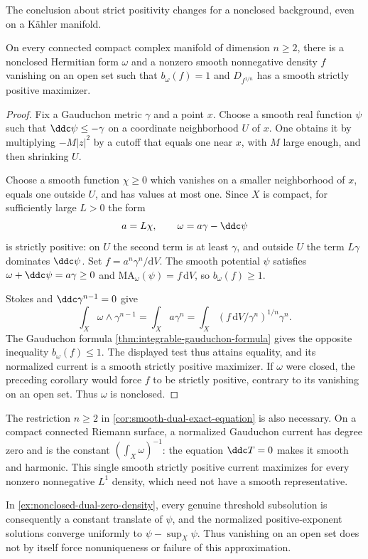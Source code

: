 The conclusion about strict positivity changes for a nonclosed background, even on a K\"ahler manifold.

\begin{example}\label{ex:nonclosed-dual-zero-density}
On every connected compact complex manifold of dimension $n\geq2$, there is a nonclosed Hermitian form $\omega$ and a nonzero smooth nonnegative density $f$ vanishing on an open set such that $b_\omega(f)=1$ and $D_{f^{1/n}}$ has a smooth strictly positive maximizer.
\end{example}
\begin{proof}
Fix a Gauduchon metric $\gamma$ and a point $x$. Choose a smooth real function $\psi$ such that $\ddc\psi\leq-\gamma$ on a coordinate neighborhood $U$ of $x$. One obtains it by multiplying $-M|z|^2$ by a cutoff that equals one near $x$, with $M$ large enough, and then shrinking $U$.

Choose a smooth function $\chi\geq0$ which vanishes on a smaller neighborhood of $x$, equals one outside $U$, and has values at most one. Since $X$ is compact, for sufficiently large $L>0$ the form
\[
 a=L\chi,\qquad \omega=a\gamma-\ddc\psi
\]
is strictly positive: on $U$ the second term is at least $\gamma$, and outside $U$ the term $L\gamma$ dominates $\ddc\psi$. Set $f=a^n\gamma^n/\mathrm{d}V$. The smooth potential $\psi$ satisfies $\omega+\ddc\psi=a\gamma\geq0$ and $\mathrm{MA}_\omega(\psi)=f\,\mathrm{d}V$, so $b_\omega(f)\geq1$.

Stokes and $\ddc\gamma^{n-1}=0$ give
\[
 \int_X\omega\wedge\gamma^{n-1}
 =\int_Xa\gamma^n
 =\int_X(f\,\mathrm{d}V/\gamma^n)^{1/n}\gamma^n.
\]
The Gauduchon formula \cref{thm:integrable-gauduchon-formula} gives the opposite inequality $b_\omega(f)\leq1$. The displayed test thus attains equality, and its normalized current is a smooth strictly positive maximizer. If $\omega$ were closed, the preceding corollary would force $f$ to be strictly positive, contrary to its vanishing on an open set. Thus $\omega$ is nonclosed.
\end{proof}

The restriction $n\geq2$ in \cref{cor:smooth-dual-exact-equation} is also necessary. On a compact connected Riemann surface, a normalized Gauduchon current has degree zero and is the constant $(\int_X\omega)^{-1}$: the equation $\ddc T=0$ makes it smooth and harmonic. This single smooth strictly positive current maximizes for every nonzero nonnegative $L^1$ density, which need not have a smooth representative.

In \cref{ex:nonclosed-dual-zero-density}, every genuine threshold subsolution is consequently a constant translate of $\psi$, and the normalized positive-exponent solutions converge uniformly to $\psi-\sup_X\psi$. Thus vanishing on an open set does not by itself force nonuniqueness or failure of this approximation.
